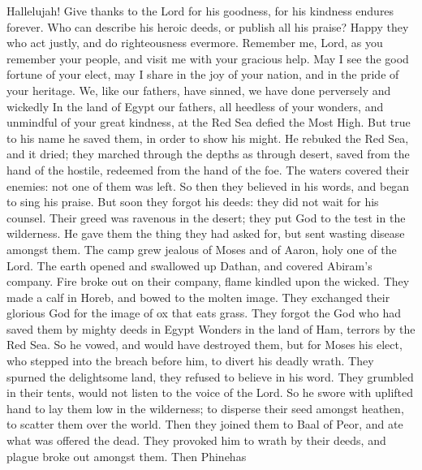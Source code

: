  Hallelujah! Give thanks to the Lord for his goodness, for
his kindness endures forever.  Who can describe his heroic
deeds, or publish all his praise?  Happy they who act
justly, and do righteousness evermore.  Remember me, Lord,
as you remember your people, and visit me with your gracious help.
 May I see the good fortune of your elect, may I share in
the joy of your nation, and in the pride of your heritage. 
We, like our fathers, have sinned, we have done perversely and wickedly
 In the land of Egypt our fathers, all heedless of your
wonders, and unmindful of your great kindness, at the Red Sea defied the
Most High.  But true to his name he saved them, in order to
show his might.  He rebuked the Red Sea, and it dried; they
marched through the depths as through desert,  saved from
the hand of the hostile, redeemed from the hand of the foe.
 The waters covered their enemies: not one of them was
left.  So then they believed in his words, and began to
sing his praise.  But soon they forgot his deeds: they did
not wait for his counsel.  Their greed was ravenous in the
desert; they put God to the test in the wilderness.  He
gave them the thing they had asked for, but sent wasting disease amongst
them.  The camp grew jealous of Moses and of Aaron, holy
one of the Lord.  The earth opened and swallowed up Dathan,
and covered Abiram's company.  Fire broke out on their
company, flame kindled upon the wicked.  They made a calf
in Horeb, and bowed to the molten image.  They exchanged
their glorious God for the image of ox that eats grass. 
They forgot the God who had saved them by mighty deeds in Egypt
 Wonders in the land of Ham, terrors by the Red Sea.
 So he vowed, and would have destroyed them, but for Moses
his elect, who stepped into the breach before him, to divert his deadly
wrath.  They spurned the delightsome land, they refused to
believe in his word.  They grumbled in their tents, would
not listen to the voice of the Lord.  So he swore with
uplifted hand to lay them low in the wilderness;  to
disperse their seed amongst heathen, to scatter them over the world.
 Then they joined them to Baal of Peor, and ate what was
offered the dead.  They provoked him to wrath by their
deeds, and plague broke out amongst them.  Then Phinehas
